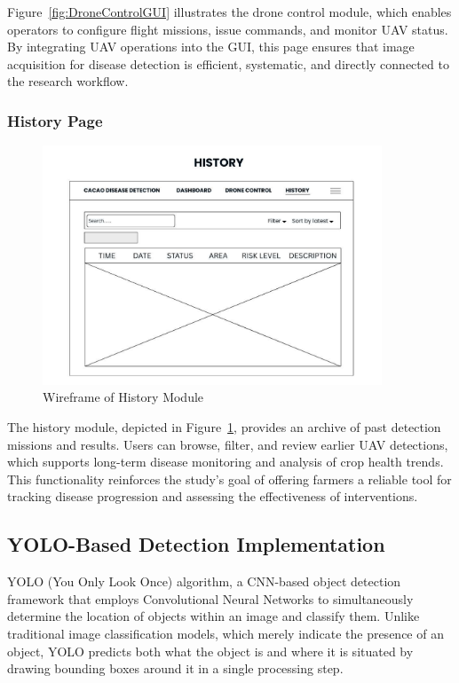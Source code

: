 Figure~\ref{fig:DroneControlGUI} illustrates the drone control module, which enables operators to configure flight missions, issue commands, and monitor UAV status. By integrating UAV operations into the GUI, this page ensures that image acquisition for disease detection is efficient, systematic, and directly connected to the research workflow.

\subsubsection*{History Page}

\begin{figure}[H]
	\centering
	\caption{Wireframe of History Module}
	\label{fig:HistoryGUI}
	\includegraphics[width=0.9\textwidth]{figures/History.pdf}
\end{figure}

The history module, depicted in Figure~\ref{fig:HistoryGUI}, provides an archive of past detection missions and results. Users can browse, filter, and review earlier UAV detections, which supports long-term disease monitoring and analysis of crop health trends. This functionality reinforces the study’s goal of offering farmers a reliable tool for tracking disease progression and assessing the effectiveness of interventions.

\subsection*{YOLO-Based Detection Implementation}
YOLO (You Only Look Once) algorithm, a CNN-based object detection framework that employs Convolutional Neural Networks to simultaneously determine the location of objects within an image and classify them. Unlike traditional image classification models, which merely indicate the presence of an object, YOLO predicts both what the object is and where it is situated by drawing bounding boxes around it in a single processing step.

